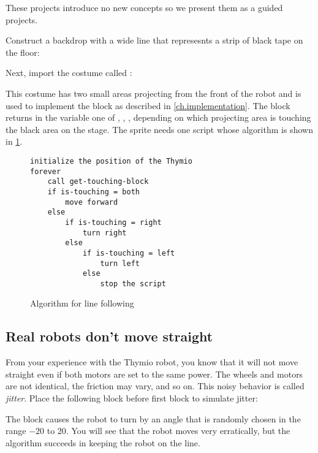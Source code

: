 \label{ch.projects}

These projects introduce no new concepts so we present them as a guided
projects.



Construct a backdrop with a wide line that represesnts a strip of black
tape on the floor:


Next, import the costume called :


This costume has two small areas projecting from the front of the robot
and is used to implement the block  as
described in \cref{ch.implementation}. The block returns in the variable
 one of , , , 
depending on which projecting area is touching the black area on the
stage. The  sprite needs one script whose algorithm is shown
in \cref{fig.line-following}.

\begin{figure}
\begin{footnotesize}
\begin{verbatim}
initialize the position of the Thymio
forever
    call get-touching-block
    if is-touching = both
        move forward
    else
        if is-touching = right
            turn right
        else
            if is-touching = left
                turn left
            else
                stop the script
\end{verbatim}
\end{footnotesize}
\caption{Algorithm for line following}\label{fig.line-following}
\end{figure}

\subsection*{Real robots don't move straight}

From your experience with the Thymio robot, you know that it will not
move straight even if both motors are set to the same power. The wheels
and motors are not identical, the friction may vary, and so on. This
noisy behavior is called \emph{jitter}. Place the following block before
first  block to simulate jitter:


The block causes the robot to turn by an angle that is randomly chosen
in the range $-20$ to $20$. You will see that the robot moves very
erratically, but the algorithm succeeds in keeping the robot on the line.


